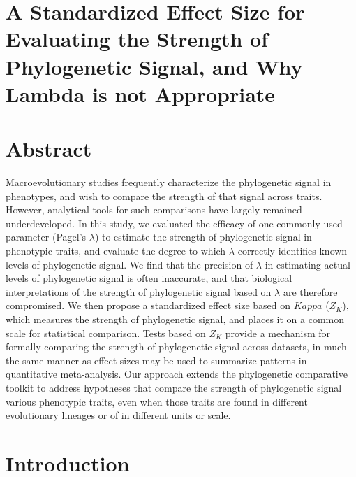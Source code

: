 \documentclass[
]{article}
\author{}
\date{\vspace{-2.5em}}
\begin{document}
\hypertarget{a-standardized-effect-size-for-evaluating-the-strength-of-phylogenetic-signal-and-why-lambda-is-not-appropriate}{%
\section{A Standardized Effect Size for Evaluating the Strength of
Phylogenetic Signal, and Why Lambda is not
Appropriate}\label{a-standardized-effect-size-for-evaluating-the-strength-of-phylogenetic-signal-and-why-lambda-is-not-appropriate}}

\hfill\break

\hypertarget{abstract}{%
\section{Abstract}\label{abstract}}

Macroevolutionary studies frequently characterize the phylogenetic
signal in phenotypes, and wish to compare the strength of that signal
across traits. However, analytical tools for such comparisons have
largely remained underdeveloped. In this study, we evaluated the
efficacy of one commonly used parameter (Pagel's \(\lambda\)) to
estimate the strength of phylogenetic signal in phenotypic traits, and
evaluate the degree to which \(\lambda\) correctly identifies known
levels of phylogenetic signal. We find that the precision of \(\lambda\)
in estimating actual levels of phylogenetic signal is often inaccurate,
and that biological interpretations of the strength of phylogenetic
signal based on \(\lambda\) are therefore compromised. We then propose a
standardized effect size based on \(Kappa\) (\(Z_K\)), which measures
the strength of phylogenetic signal, and places it on a common scale for
statistical comparison. Tests based on \(Z_K\) provide a mechanism for
formally comparing the strength of phylogenetic signal across datasets,
in much the same manner as effect sizes may be used to summarize
patterns in quantitative meta-analysis. Our approach extends the
phylogenetic comparative toolkit to address hypotheses that compare the
strength of phylogenetic signal various phenotypic traits, even when
those traits are found in different evolutionary lineages or of in
different units or scale.

\newpage

\hypertarget{introduction}{%
\section{Introduction}\label{introduction}}
\end{document}

